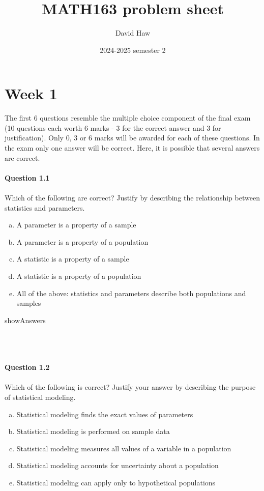 \documentclass{article}
\title{MATH163 problem sheet}
\author{David Haw}
\date{2024-2025 semester 2}
\begin{document}
\maketitle

\section*{Week 1}
The first 6 questions resemble the multiple choice component of the final exam (10 questions each worth 6 marks - 3 for the correct answer and 3 for justification). Only 0, 3 or 6 marks will be awarded for each of these questions. In the exam only one answer will be correct. Here, it is possible that several answers are correct.
~\\~\\
{\bf Question 1.1}
~\\~\\
Which of the following are correct? Justify by describing the relationship between statistics and parameters. 
\begin{enumerate}[(a)]
    \item A parameter is a property of a sample
    \item A parameter is a property of a population
    \item A statistic is a property of a sample
    \item A statistic is  a property of a population
    \item All of the above: statistics and parameters describe both populations and samples
\end{enumerate}
\begin{maybePrint}{showAnswers}
~\\~\\
~\\~\\
\end{maybePrint}
%
%
{\bf Question 1.2}
~\\~\\
Which of the following is correct? Justify your answer by describing the purpose of statistical modeling.
\begin{enumerate}[(a)]
    \item Statistical modeling finds the exact values of parameters
    \item Statistical modeling is performed on sample data
    \item Statistical modeling measures all values of a variable in a population
    \item Statistical modeling accounts for uncertainty about a population
    \item Statistical modeling can apply only to hypothetical populations
\end{enumerate}
\end{document}
